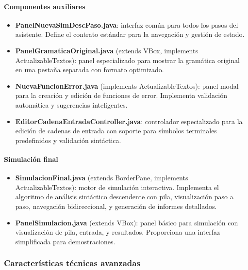 \paragraph{Componentes auxiliares}
\begin{itemize}
    \item \textbf{PanelNuevaSimDescPaso.java}: interfaz común para todos los pasos del asistente. Define el contrato estándar para la navegación y gestión de estado.

    \item \textbf{PanelGramaticaOriginal.java} (extends VBox, implements ActualizableTextos): panel especializado para mostrar la gramática original en una pestaña separada con formato optimizado.

    \item \textbf{NuevaFuncionError.java} (implements ActualizableTextos): panel modal para la creación y edición de funciones de error. Implementa validación automática y sugerencias inteligentes.

    \item \textbf{EditorCadenaEntradaController.java}: controlador especializado para la edición de cadenas de entrada con soporte para símbolos terminales predefinidos y validación sintáctica.
\end{itemize}

\paragraph{Simulación final}
\begin{itemize}
    \item \textbf{SimulacionFinal.java} (extends BorderPane, implements ActualizableTextos): motor de simulación interactiva. Implementa el algoritmo de análisis sintáctico descendente con pila, visualización paso a paso, navegación bidireccional, y generación de informes detallados.

    \item \textbf{PanelSimulacion.java} (extends VBox): panel básico para simulación con visualización de pila, entrada, y resultados. Proporciona una interfaz simplificada para demostraciones.
\end{itemize}

\subsubsection{Características técnicas avanzadas}

